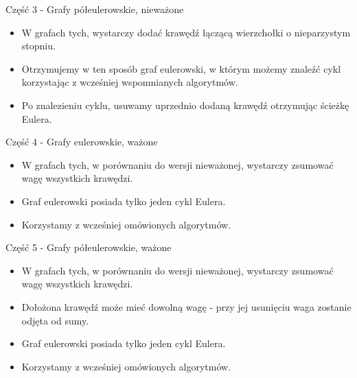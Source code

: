 \documentclass[polish,envcountsect,10pt]{beamer}
\begin{document}
\begin{frame}{Część 3 - Grafy półeulerowskie, nieważone}
    \begin{block}{}
        \begin{itemize}
            \item W grafach tych, wystarczy dodać krawędź łączącą wierzchołki o nieparzystym stopniu.
            \item Otrzymujemy w ten sposób graf eulerowski, w którym możemy znaleźć cykl korzystając z wcześniej wspomnianych algorytmów.
            \item Po znalezieniu cyklu, usuwamy uprzednio dodaną krawędź otrzymując ścieżkę Eulera.
        \end{itemize}
    \end{block}
\end{frame}

\begin{frame}{Część 4 - Grafy eulerowskie, ważone}
    \begin{block}{}
        \begin{itemize}
            \item W grafach tych, w porównaniu do wersji nieważonej, wystarczy zsumować wagę wszystkich krawędzi.
            \item Graf eulerowski posiada tylko jeden cykl Eulera.
            \item Korzystamy z wcześniej omówionych algorytmów.
        \end{itemize}
    \end{block}
\end{frame}

\begin{frame}{Część 5 - Grafy półeulerowskie, ważone}
    \begin{block}{}
        \begin{itemize}
            \item W grafach tych, w porównaniu do wersji nieważonej, wystarczy zsumować wagę wszystkich krawędzi.
            \item Dołożona krawędź może mieć dowolną wagę - przy jej usunięciu waga zostanie odjęta od sumy.
            \item Graf eulerowski posiada tylko jeden cykl Eulera.
            \item Korzystamy z wcześniej omówionych algorytmów.
        \end{itemize}
    \end{block}
\end{frame}
\end{document}
